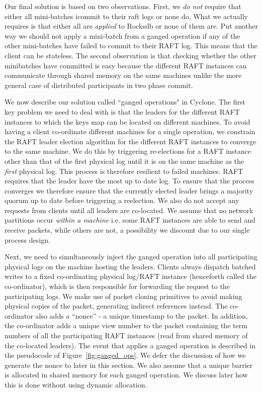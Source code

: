 \documentclass[letterpaper,twocolumn,10pt]{article}
\begin{document}
Our final solution is based on two observations. First, we \emph {do not} require that either all mini-batches
icommit to their raft logs or none do, What we actually requires is that either all are \emph{applied} to Rocksdb or 
none of them are. Put another way we should not apply a mini-batch from a ganged operation if any of the other mini-batches
have failed to commit to their RAFT log. This means that the client can be stateless. The second observation is that
checking whether the other minibatches have committed is easy because the different RAFT instances can communicate 
through shared memory on the same machines unlike the more general case of distributed participants in two phase 
commit.

We now describe our solution called ``ganged operations" in Cyclone. 
The first key problem we need to deal with is that the leaders for the different
RAFT instances to which the keys map can be located on different machines. To
avoid having a client co-ordinate different machines for a single operation, we
constrain the RAFT leader election algorithm for the different RAFT instances to
converge to the same machine. We do this by triggering re-elections for a RAFT
instance other than that of the first physical log until it is on the same
machine as the \emph{first} physical log. This process is therefore resilient to
failed machines. RAFT requires that the leader have the most up to date log. To
ensure that the process converges we therefore ensure that the currently elected
leader brings a majority quorum up to date before triggering a reelection. We
also do not accept any requests from clients until all leaders are
co-located. We assume that no network partitions occur \emph{within a machine}
i.e. some RAFT instances are able to send and receive packets, while others are
not, a possibility we discount due to our single process design.

Next, we need to simultaneously inject the ganged operation into all
participating physical logs on the machine hosting the leaders. Clients always
dispatch batched writes to a fixed co-ordinating physical log/RAFT instance
(henceforth called the co-ordinator), which is then responsible for forwarding
the request to the participating logs. We make use of packet cloning primitives
to avoid making physical copies of the packet, generating indirect references
instead. The co-ordinator also adds a ``nonce'' - a unique timestamp to the
packet. In addition, the co-ordinator adds a unique view number to the packet
containing the term numbers of all the participating RAFT instances (read from
shared memory of the co-located leaders).  The event that applies a ganged
operation is described in the pseudocode of Figure~\ref{fig:ganged_ops}. We
defer the discussion of how we generate the nonce to later in this section. We
also assume that a unique barrier is allocated in shared memory for each ganged
operation. We discuss later how this is done without using dynamic allocation.
\end{document}
